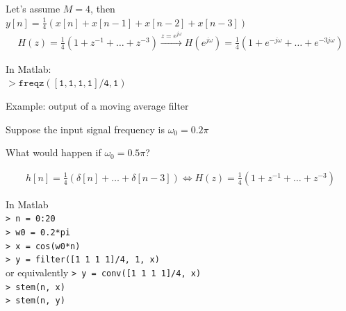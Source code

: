 \documentclass[10pt, handout]{beamer}
\begin{document}
\begin{frame}
\vspace{0.5cm}
Let's assume $M = 4$, then $y[n] = \frac{1}{4}(x[n] + x[n-1] + x[n-2] + x[n-3])$
\begin{align*}
H(z) = \frac{1}{4}(1 + z^{-1} + \ldots + z^{-3}) \xrightarrow{z = e^{j\omega}} H(e^{j\omega}) = \frac{1}{4}(1 + e^{-j\omega} + \ldots+ e^{-3j\omega})
\end{align*}

In Matlab:\\
$> \mathtt{freqz([1, 1, 1, 1]/4, 1)}$

\begin{center}
\end{center}

\end{frame}

\begin{frame}{Example: output of a moving average filter}

 {Suppose the input signal frequency is $\omega_0 = 0.2\pi$}

 {What would happen if $\omega_0 = 0.5\pi$?}

\begin{center}
	\resizebox{\linewidth}{!}{}
\end{center}
\begin{align*}
h[n] = \frac{1}{4}(\delta[n] + \ldots + \delta[n-3]) \Longleftrightarrow H(z) = \frac{1}{4}(1 + z^{-1} + \ldots + z^{-3})
\end{align*}

\end{frame}

\begin{frame}
	
In Matlab \\
\texttt{> n = 0:20} \\
\texttt{> w0 = 0.2*pi} \\
\texttt{> x = cos(w0*n)} \\
\texttt{> y = filter([1 1 1 1]/4, 1, x)} \\
or equivalently \texttt{> y = conv([1 1 1 1]/4, x)} \\
\texttt{> stem(n, x)} \\
\texttt{> stem(n, y)} \\

\end{frame}
\end{document}

